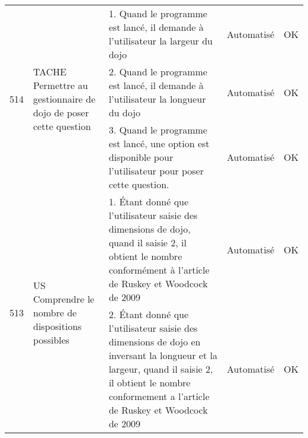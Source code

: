 \begin{adjustwidth}{-1.5cm}{0cm}
{\begin{tabular}{|m{0.6cm}|m{5.5cm}|m{8cm}|m{2cm}|c|}
            \multirow{3}{0.6cm}{514} & \multirow{3}{5.5cm}{TACHE Permettre au gestionnaire de dojo de poser cette question}                                                          & 1. Quand le programme est lancé, il demande à l'utilisateur la largeur du dojo                                                                                                                                             & Automatisé      & OK       \\ \cline{3-5}
                                     &                                                                                                                                               & 2. Quand le programme est lancé, il demande à l'utilisateur la longueur du dojo                                                                                                                                            & Automatisé      & OK       \\ \cline{3-5}
                                     &                                                                                                                                               & 3. Quand le programme est lancé, une option est disponible pour l'utilisateur pour poser cette question.                                                                                                                   & Automatisé      & OK       \\ \hline
            \multirow{2}{0.6cm}{513} & \multirow{2}{5.5cm}{US Comprendre le nombre de dispositions possibles}                                                                        & \cellcolor{tsgrey} 1. Étant donné que l'utilisateur saisie des dimensions de dojo, quand il saisie 2, il obtient le nombre conformément à l'article de Ruskey et Woodcock de 2009                                        & Automatisé      & OK       \\ \cline{3-5}
                                     &                                                                                                                                               & \cellcolor{tsgrey} 2. Étant donné que l'utilisateur saisie des dimensions de dojo en inversant la longueur et la largeur, quand il saisie 2, il obtient le nombre conformement a l'article de Ruskey et Woodcock de 2009 & Automatisé      & OK       \\ \hline


\end{tabular}}
\end{adjustwidth}
